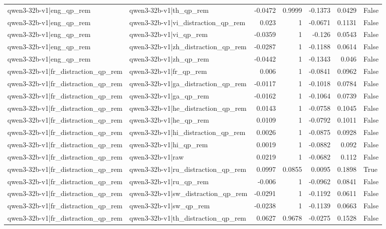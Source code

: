 \begin{table}
\begin{tabular}{l l r r r r l}
qwen3-32b-v1|eng_qp_rem & qwen3-32b-v1|th_qp_rem & -0.0472 & 0.9999 & -0.1373 & 0.0429 & False \\
qwen3-32b-v1|eng_qp_rem & qwen3-32b-v1|vi_distraction_qp_rem & 0.023 & 1 & -0.0671 & 0.1131 & False \\
qwen3-32b-v1|eng_qp_rem & qwen3-32b-v1|vi_qp_rem & -0.0359 & 1 & -0.126 & 0.0543 & False \\
qwen3-32b-v1|eng_qp_rem & qwen3-32b-v1|zh_distraction_qp_rem & -0.0287 & 1 & -0.1188 & 0.0614 & False \\
qwen3-32b-v1|eng_qp_rem & qwen3-32b-v1|zh_qp_rem & -0.0442 & 1 & -0.1343 & 0.046 & False \\
qwen3-32b-v1|fr_distraction_qp_rem & qwen3-32b-v1|fr_qp_rem & 0.006 & 1 & -0.0841 & 0.0962 & False \\
qwen3-32b-v1|fr_distraction_qp_rem & qwen3-32b-v1|ga_distraction_qp_rem & -0.0117 & 1 & -0.1018 & 0.0784 & False \\
qwen3-32b-v1|fr_distraction_qp_rem & qwen3-32b-v1|ga_qp_rem & -0.0162 & 1 & -0.1064 & 0.0739 & False \\
qwen3-32b-v1|fr_distraction_qp_rem & qwen3-32b-v1|he_distraction_qp_rem & 0.0143 & 1 & -0.0758 & 0.1045 & False \\
qwen3-32b-v1|fr_distraction_qp_rem & qwen3-32b-v1|he_qp_rem & 0.0109 & 1 & -0.0792 & 0.1011 & False \\
qwen3-32b-v1|fr_distraction_qp_rem & qwen3-32b-v1|hi_distraction_qp_rem & 0.0026 & 1 & -0.0875 & 0.0928 & False \\
qwen3-32b-v1|fr_distraction_qp_rem & qwen3-32b-v1|hi_qp_rem & 0.0019 & 1 & -0.0882 & 0.092 & False \\
qwen3-32b-v1|fr_distraction_qp_rem & qwen3-32b-v1|raw & 0.0219 & 1 & -0.0682 & 0.112 & False \\
qwen3-32b-v1|fr_distraction_qp_rem & qwen3-32b-v1|ru_distraction_qp_rem & 0.0997 & 0.0855 & 0.0095 & 0.1898 & True \\
qwen3-32b-v1|fr_distraction_qp_rem & qwen3-32b-v1|ru_qp_rem & -0.006 & 1 & -0.0962 & 0.0841 & False \\
qwen3-32b-v1|fr_distraction_qp_rem & qwen3-32b-v1|sw_distraction_qp_rem & -0.0291 & 1 & -0.1192 & 0.0611 & False \\
qwen3-32b-v1|fr_distraction_qp_rem & qwen3-32b-v1|sw_qp_rem & -0.0238 & 1 & -0.1139 & 0.0663 & False \\
qwen3-32b-v1|fr_distraction_qp_rem & qwen3-32b-v1|th_distraction_qp_rem & 0.0627 & 0.9678 & -0.0275 & 0.1528 & False \\

\end{tabular}
\end{table}
